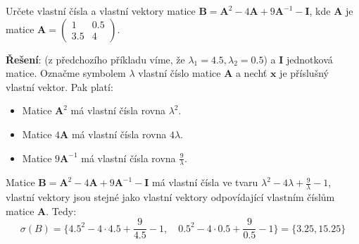 \begin{example}\label{mai:exam014}
  Určete vlastní čísla a vlastní vektory matice \(\mathbf{B} = \mathbf{A}^2 - 4\mathbf{A} + 
  9\mathbf{A}^{-1} - \mathbf{I}\), kde \(\mathbf{A}\) je matice \(\mathbf{A}= 
  \begin{pmatrix}1&0.5\\3.5&4\end{pmatrix}\).

  \textbf{Řešení}: (z předchozího příkladu víme, že \(\lambda_1=4.5, \lambda_2=0.5\)) a
   \(\mathbf{I}\) jednotková matice. Označme symbolem \(\lambda\) vlastní číslo matice 
   \(\mathbf{A}\) a nechť \(\mathbf{x}\) je příslušný vlastní vektor. Pak platí:
   \begin{itemize}
     \item Matice \(\mathbf{A}^2\) má vlastní čísla rovna \(\lambda^2\).
     \item Matice \(4\mathbf{A}\) má vlastní čísla rovna \(4\lambda\).
     \item Matice \(9\mathbf{A}^{-1}\) má vlastní čísla rovna \(\frac{9}{\lambda}\).
   \end{itemize}
   Matice \(\mathbf{B}=\mathbf{A}^2-4\mathbf{A}+9\mathbf{A}^{-1}-\mathbf{I}\) má vlastní čísla 
   ve tvaru  \(\lambda^2-4\lambda+\frac{9}{\lambda}-1\), vlastní vektory jsou stejné jako 
   vlastní vektory odpovídající vlastním číslům matice \(\mathbf{A}\). Tedy:
   \begin{equation*}
       \sigma(B)=\{4.5^2-4\cdot4.5+\frac{9}{4.5}-1,\quad
       0.5^2-4\cdot0.5+\frac{9}{0.5}-1\}=\{3.25, 15.25\}
   \end{equation*}
\end{example}